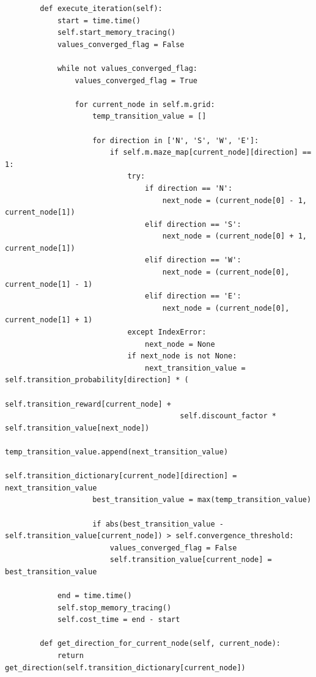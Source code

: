 \documentclass{article}
\begin{document}
\begin{lstlisting}
        def execute_iteration(self):
            start = time.time()
            self.start_memory_tracing()
            values_converged_flag = False
    
            while not values_converged_flag:
                values_converged_flag = True
    
                for current_node in self.m.grid:
                    temp_transition_value = []
    
                    for direction in ['N', 'S', 'W', 'E']:
                        if self.m.maze_map[current_node][direction] == 1:
                            try:
                                if direction == 'N':
                                    next_node = (current_node[0] - 1, current_node[1])
                                elif direction == 'S':
                                    next_node = (current_node[0] + 1, current_node[1])
                                elif direction == 'W':
                                    next_node = (current_node[0], current_node[1] - 1)
                                elif direction == 'E':
                                    next_node = (current_node[0], current_node[1] + 1)
                            except IndexError:
                                next_node = None
                            if next_node is not None:
                                next_transition_value = self.transition_probability[direction] * (
                                        self.transition_reward[current_node] +
                                        self.discount_factor * self.transition_value[next_node])
                                temp_transition_value.append(next_transition_value)
                                self.transition_dictionary[current_node][direction] = next_transition_value
                    best_transition_value = max(temp_transition_value)
    
                    if abs(best_transition_value - self.transition_value[current_node]) > self.convergence_threshold:
                        values_converged_flag = False
                        self.transition_value[current_node] = best_transition_value
    
            end = time.time()
            self.stop_memory_tracing()
            self.cost_time = end - start
    
        def get_direction_for_current_node(self, current_node):
            return get_direction(self.transition_dictionary[current_node])


\end{lstlisting}
\end{document}
